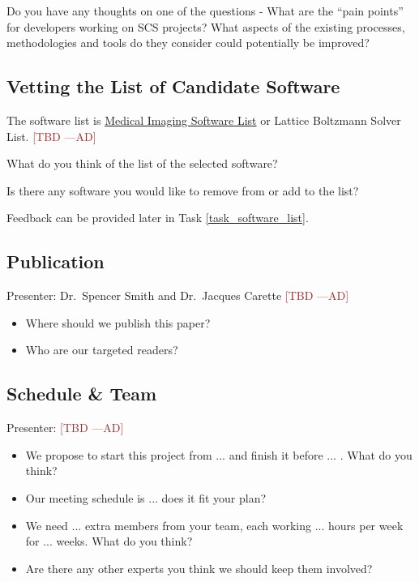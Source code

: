 \documentclass[12pt]{article}
\newcommand{\authornote}[3]{\textcolor{#1}{[#3 ---#2]}}
\newcommand{\authornote}[3]{}
\newcommand{\ad}[1]{\authornote{brown}{AD}{#1}} %
\begin{document}
Do you have any thoughts on one of the questions - What are the ``pain points''
for developers working on SCS projects? What aspects of the existing processes,
methodologies and tools do they consider could potentially be improved?

\subsection{Vetting the List of Candidate Software}
\label{software_list}

The software list is
\href{https://docs.google.com/spreadsheets/d/122wU0v3ZtvDcqy8C4zKJ89kU-8fXAbo3Mzn6vcVXOi0/edit?usp=sharing}{Medical
	Imaging Software List} or Lattice Boltzmann Solver List. \ad{TBD}

What do you think of the list of the selected software?

Is there any software you would like to remove from or add to the list?

Feedback can be provided later in Task \ref{task_software_list}.

\subsection{Publication}
Presenter: Dr.\ Spencer Smith and Dr.\ Jacques Carette \ad{TBD}

\begin{itemize}
\item Where should we publish this paper?
\item Who are our targeted readers?
\end{itemize}

\subsection{Schedule \& Team}
Presenter: \ad{TBD}

\begin{itemize}
\item We propose to start this project from ... and finish it before ... . What
do you think?
\item Our meeting schedule is ... does it fit your plan?
\item We need ... extra members from your team, each working ... hours per week
for ... weeks. What do you think?
\item Are there any other experts you think we should keep them involved?
\end{itemize}
\end{document}
